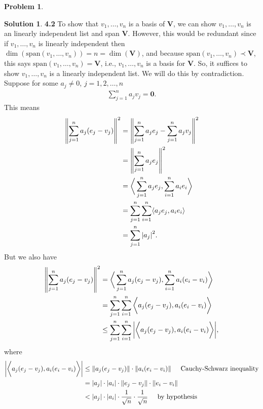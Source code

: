\documentclass{article}
\theoremstyle{definition}
\newtheorem*{prob*}{Problem}
\newtheorem*{sln*}{Solution}
\newcommand{\V}{\mathbf{V}}
\newcommand{\xpan}{\text{span}}
\newcommand{\la}{\langle}
\newcommand{\ra}{\rangle}
\begin{document}
\begin{prob*}
\begin{enumerate}
		\begin{sln*}\textbf{4.2}
			To show that $v_1,\dots,v_n$ is a basis of $\V$, we can show $v_1,\dots,v_n$ is an linearly independent list and span $\V$. However, this would be redundant since if $v_1,\dots,v_n$ is linearly independent then $\dim(\xpan(v_1,\dots,v_n)) = n = \dim(\V)$, and because $\xpan(v_1,\dots,v_n) \prec \V$, this says $\xpan(v_1,\dots,v_n) = \V$, i.e., $v_1,\dots,v_n$ is a basis for $\V$. So, it suffices to show $v_1,\dots,v_n$ is a linearly independent list. We will do this by contradiction. \\
			
			Suppose for some $a_j \neq 0$, $j=1,2,\dots,n$
			\begin{align*}
			\sum^n_{j=1}a_j v_j = \mathbf{0}.
			\end{align*}
			This means
			\begin{align*}
			\norm{\sum^n_{j=1} a_j(e_j - v_j)}^2 
			&= \norm{ \sum^n_{j=1}	a_j e_j - \sum^n_{j=1}a_jv_j }^2 \\
			&= \norm{\sum^n_{j=1}a_je_j}^2 \\
			&= \bigg\la \sum^n_{j=1}a_je_j, \sum^n_{i=1}a_ie_i \bigg\ra  \\
			&= \sum^n_{j=1}\sum^n_{i=1}\la a_j e_j , a_ie_i \ra\\
			&= \sum^n_{j=1}\abs{a_j}^2.
			\end{align*}
			But we also have
			\begin{align*}
			\norm{\sum^n_{j=1} a_j(e_j - v_j)}^2 
			&= \bigg\la    \sum^n_{j=1}a_j(e_j - v_j) , \sum^n_{i=1}a_i(e_i - v_i)\bigg\ra\\
			&= \sum^n_{j=1}\sum^n_{i=1}\bigg\la  a_j(e_j - v_j) , a_i(e_i - v_i)\bigg\ra\\
			&\leq \sum^n_{j=1}\sum^n_{i=1} \bigg\vert \bigg\la a_j(e_j - v_j), a_i(e_i - v_i) \bigg\ra \bigg\vert,
			\end{align*}
			where 
			\begin{align*}
			\bigg\vert \bigg\la a_j(e_j - v_j), a_i(e_i - v_i) \bigg\ra \bigg\vert 
			&\leq \norm{a_j(e_j - v_j)} \cdot \norm{a_i(e_i - v_i)} \hspace{0.5cm} \text{Cauchy-Schwarz inequality} \\
			&= \abs{a_j}\cdot \abs{a_i} \cdot \norm{e_j - v_j}\cdot \norm{e_i - v_i}\\
			&< \abs{a_j}\cdot \abs{a_i}\cdot \frac{1}{\sqrt{n}} \cdot \frac{1}{\sqrt{n}} \hspace{0.5cm}\text{by hypothesis}\\

\end{align*}
\end{sln*}
\end{enumerate}
\end{prob*}
\end{document}
